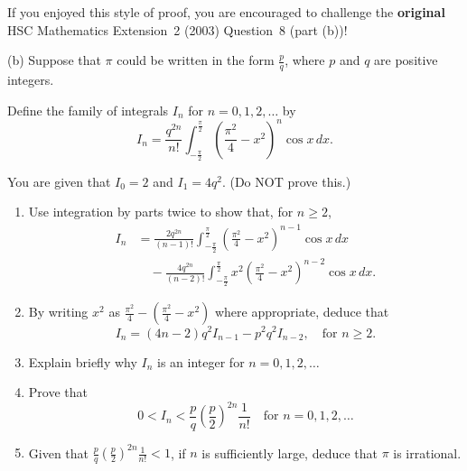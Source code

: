 \begin{remark}
    If you enjoyed this style of proof, you are encouraged to challenge the \textbf{original} HSC Mathematics Extension~2 (2003) Question~8 (part (b))!
    
    \medskip
    
    (b) Suppose that $\pi$ could be written in the form $\frac{p}{q}$, where $p$ and $q$ are positive integers.
    
    Define the family of integrals $I_n$ for $n = 0, 1, 2, \dots$ by
    \[
    I_n = \frac{q^{2n}}{n!} \int_{-\frac{\pi}{2}}^{\frac{\pi}{2}} \left(\frac{\pi^2}{4} - x^2\right)^n \cos x \, dx.
    \]
    
    You are given that $I_0 = 2$ and $I_1 = 4q^2$. (Do NOT prove this.)
    
    \begin{enumerate}[label=(\roman*)]
      \item Use integration by parts twice to show that, for $n \ge 2$,
      \begin{align*}
        I_n &= \frac{2q^{2n}}{(n-1)!} \int_{-\frac{\pi}{2}}^{\frac{\pi}{2}} \left(\frac{\pi^2}{4} - x^2\right)^{n-1} \cos x \, dx \\
        &\quad - \frac{4q^{2n}}{(n-2)!} \int_{-\frac{\pi}{2}}^{\frac{\pi}{2}} x^2 \left(\frac{\pi^2}{4} - x^2\right)^{n-2} \cos x \, dx.
      \end{align*}
    
      \item By writing $x^2$ as $\frac{\pi^2}{4} - \left(\frac{\pi^2}{4} - x^2\right)$ where appropriate, deduce that
      \[
        I_n = (4n-2)q^2 I_{n-1} - p^2 q^2 I_{n-2}, \quad \text{for } n \ge 2.
      \]
    
      \item Explain briefly why $I_n$ is an integer for $n = 0, 1, 2, \dots$
    
      \item Prove that
      \[
        0 < I_n < \frac{p}{q}\left(\frac{p}{2}\right)^{2n}\frac{1}{n!} \quad \text{for } n = 0, 1, 2, \dots
      \]
    
      \item Given that $\frac{p}{q}\left(\frac{p}{2}\right)^{2n}\frac{1}{n!} < 1$, if $n$ is sufficiently large, deduce that $\pi$ is irrational.
    \end{enumerate}
    \end{remark}

\newpage

